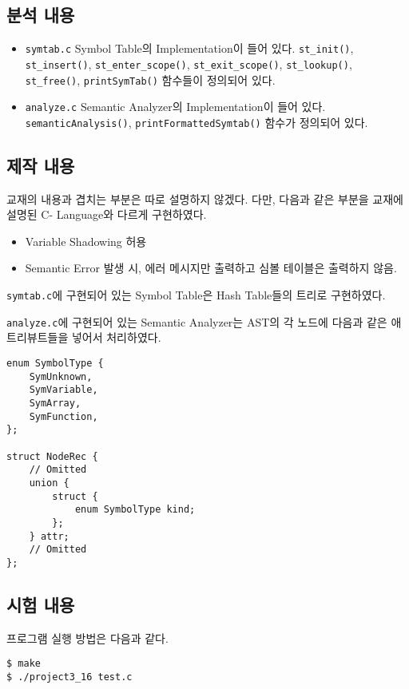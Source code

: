 \documentclass[a4paper, 10pt]{oblivoir}
\begin{document}
\subsection{분석 내용}
\begin{itemize}
\item \texttt{symtab.c} \newline
 Symbol Table의 Implementation이 들어 있다. \texttt{st\_init()}, \texttt{st\_insert()}, \texttt{st\_enter\_scope()}, \texttt{st\_exit\_scope()}, \texttt{st\_lookup()}, \texttt{st\_free()}, \texttt{printSymTab()} 함수들이 정의되어 있다.
\item \texttt{analyze.c} \newline
 Semantic Analyzer의 Implementation이 들어 있다. \texttt{semanticAnalysis()}, \texttt{printFormattedSymtab()} 함수가 정의되어 있다.
\end{itemize}

\subsection{제작 내용}
교재의 내용과 겹치는 부분은 따로 설명하지 않겠다.
다만, 다음과 같은 부분을 교재에 설명된 C- Language와 다르게 구현하였다.

\begin{itemize}
	\item Variable Shadowing 허용
	\item Semantic Error 발생 시, 에러 메시지만 출력하고 심볼 테이블은 출력하지 않음.
\end{itemize}

\texttt{symtab.c}에 구현되어 있는 Symbol Table은 Hash Table들의 트리로 구현하였다.

\texttt{analyze.c}에 구현되어 있는 Semantic Analyzer는 AST의 각 노드에 다음과 같은 애트리뷰트들을 넣어서 처리하였다.

\begin{lstlisting}[frame=single]
enum SymbolType {
    SymUnknown,
    SymVariable,
    SymArray,
    SymFunction,
};

struct NodeRec {
    // Omitted
    union {
        struct {
            enum SymbolType kind;
        };
    } attr;
    // Omitted
};
\end{lstlisting}

\subsection{시험 내용}
프로그램 실행 방법은 다음과 같다.
\begin{lstlisting}[frame=single]
$ make
$ ./project3_16 test.c
\end{lstlisting}
\end{document}

